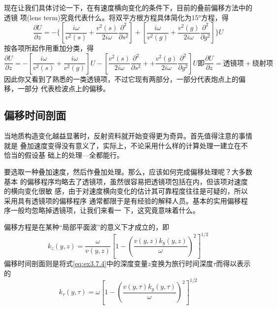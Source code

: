 现在让我们具体讨论一下，在有速度横向变化的条件下，目前的叠前偏移方法中的透镜
项(lens term)究竟代表什么。将双平方根方程具体简化为15°方程，得
\begin{equation}
\frac{\partial U}{\partial z}=-\{
[\frac{i\omega}{v^2(s)}+\frac{v^2(s)}{2i\omega}\frac{\partial^2}{\partial s^2}]+
[\frac{i\omega}{v^2(g)}+\frac{v^2(g)}{2i\omega}\frac{\partial^2}{\partial g^2}]
\}U
\label{eq:ex3.7.2}
\end{equation}
按各项所起作用重加分类，得
\begin{subequations}
\begin{equation}
\frac{\partial U}{\partial z}=-
[\frac{i\omega}{v^2(s)}+\frac{i\omega}{v^2(g)}]U-
[\frac{v^2(s)}{2i\omega}\frac{\partial^2}{\partial s^2}+
+\frac{v^2(g)}{2i\omega}\frac{\partial^2}{\partial g^2}]U
\label{eq:ex3.7.3a}
\end{equation}
即
\begin{equation}
\frac{\partial U}{\partial z}=\textbf{透镜项}+\textbf{绕射项}
\label{eq:ex3.7.3b}
\end{equation}
\end{subequations}
因此你又看到了熟悉的一类透镜项，不过它现有两部分，一部分代表炮点上的偏移，一部分
代表检波点上的偏移。

\subsection{偏移时间剖面}
\label{sec:3.7.8}

当地质构造变化越益显著时，反射资料就开始变得更为奇异。首先值得注意的事情就是
叠加速度变得没有意义了，实际上，不论采用什么样的计算处理一建立在不恰当的假设基
础上的处理---全都能行。

要选取一种叠加速度，然后作叠加处理。那么，应该如何完成偏移处理呢？大多数基本
的偏移程序均略去了透镜项，虽然很容易把透镜项包括在内，但该项对速度的横向变化很敏
感，由于对速度横向变化的估计其可靠程度往往是可疑的，所以采用具有透镜项的偏移程序
通常都限于是有经验的解释人员。基本的实用偏移程序一般均忽略掉透镜项，让我们来看一
下，这究竟意味着什么。

偏移方程是在某种“局部平面波”的意义下才成立的，即
\begin{equation}
k_z(y,z)=\frac{\omega}{v(y,z)}[1-(\frac{v(y,z)k_y(y,z)}{\omega})^2]^{1/2}
\label{eq:ex3.7.4}
\end{equation}
偏移时间剖面则是将式\ref{eq:ex3.7.4}中的深度变量$z$变换为旅行时间深度$\tau$而得以表示的
\begin{equation}
k_\tau(y,\tau)=\omega[1-(\frac{v(y,\tau)k_y(y,\tau)}{\omega})^2]^{1/2}
\label{eq:ex3.7.5}
\end{equation}

